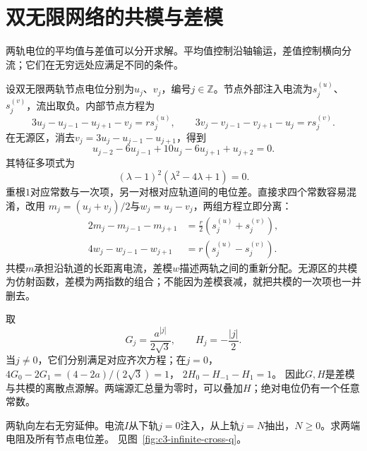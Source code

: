 \section{双无限网络的共模与差模}\label{sec:c3-potential}
两轨电位的平均值与差值可以分开求解。平均值控制沿轴输运，差值控制横向分流；它们在无穷远处应满足不同的条件。

设双无限两轨节点电位分别为$u_j$、$v_j$，编号$j\in\mathbb Z$。节点外部注入电流为$s_j^{(u)}$、$s_j^{(v)}$，流出取负。内部节点方程为
\[
 3u_j-u_{j-1}-u_{j+1}-v_j=rs_j^{(u)},\qquad
 3v_j-v_{j-1}-v_{j+1}-u_j=rs_j^{(v)}.
\]
在无源区，消去$v_j=3u_j-u_{j-1}-u_{j+1}$，得到
\[
 u_{j-2}-6u_{j-1}+10u_j-6u_{j+1}+u_{j+2}=0.
\]
其特征多项式为
\[
 (\lambda-1)^2(\lambda^2-4\lambda+1)=0.
\]
重根$1$对应常数与一次项，另一对根对应轨道间的电位差。直接求四个常数容易混淆，改用
$m_j=(u_j+v_j)/2$与$w_j=u_j-v_j$，两组方程立即分离：
\begin{align}
 2m_j-m_{j-1}-m_{j+1}&=\frac r2(s_j^{(u)}+s_j^{(v)}),\\
 4w_j-w_{j-1}-w_{j+1}&=r(s_j^{(u)}-s_j^{(v)}).
\end{align}
共模$m$承担沿轨道的长距离电流，差模$w$描述两轨之间的重新分配。无源区的共模为仿射函数，差模为两指数的组合；不能因为差模衰减，就把共模的一次项也一并删去。

取
\[
 G_j=\frac{a^{|j|}}{2\sqrt3},\qquad H_j=-\frac{|j|}2.
\]
当$j\ne0$，它们分别满足对应齐次方程；在$j=0$，
$4G_0-2G_1=(4-2a)/(2\sqrt3)=1$，
$2H_0-H_{-1}-H_1=1$。
因此$G,H$是差模与共模的离散点源解。两端源汇总量为零时，可以叠加$H$；绝对电位仍有一个任意常数。

\begin{example}[双无限异轨电阻]\label{ex:c3-infinite-cross}
两轨向左右无穷延伸。电流$I$从下轨$j=0$注入，从上轨$j=N$抽出，$N\ge0$。求两端电阻及所有节点电位差。 见图~\ref{fig:c3-infinite-cross-q}。
\end{example}

